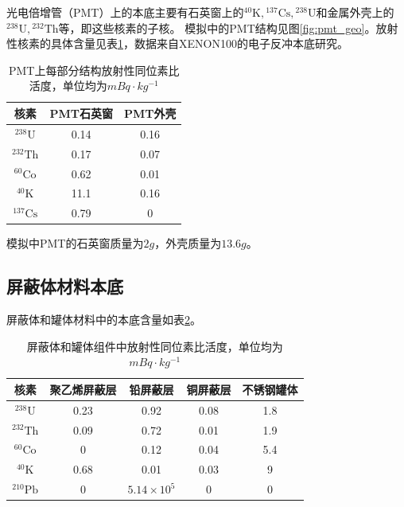 光电倍增管（PMT）上的本底主要有石英窗上的${}^{40}\mathrm{K},{}^{137}\mathrm{Cs},{}^{238}\mathrm{U}$和金属外壳上的${}^{238}\mathrm{U},{}^{232}\mathrm{Th}$等，即这些核素的子核。
模拟中的PMT结构见图\ref{fig:pmt_geo}。放射性核素的具体含量见表\ref{tab:pmt_radio}，数据来自XENON100的电子反冲本底研究\cite{xenon100_collaboration_study_2013}。

\begin{table}
  \centering
  \caption{PMT上每部分结构放射性同位素比活度，单位均为$\si{mBq\cdot kg^{-1}}$}
  \begin{tabular}{ccc}
    \toprule
    核素 & PMT石英窗 & PMT外壳 \\
    \midrule
    ${}^{238}\mathrm{U}$ & 0.14 & 0.16 \\
    ${}^{232}\mathrm{Th}$ & 0.17 & 0.07 \\
    ${}^{60}\mathrm{Co}$ & 0.62 & 0.01 \\
    ${}^{40}\mathrm{K}$ & 11.1 & 0.16 \\
    ${}^{137}\mathrm{Cs}$ & 0.79 & 0 \\
    \bottomrule
  \end{tabular}
  \label{tab:pmt_radio}
\end{table}

模拟中PMT的石英窗质量为$2\si{g}$，外壳质量为$13.6\si{g}$。

\subsection{屏蔽体材料本底}

屏蔽体和罐体材料中的本底含量如表\ref{tab:shield_radio}。

\begin{table}
  \centering
  \caption{屏蔽体和罐体组件中放射性同位素比活度，单位均为$\si{mBq\cdot kg^{-1}}$}
  \begin{tabular}{ccccc}
    \toprule
    核素 & 聚乙烯屏蔽层 & 铅屏蔽层 & 铜屏蔽层 & 不锈钢罐体 \\
    \midrule
    ${}^{238}\mathrm{U}$ & 0.23 & 0.92 & 0.08 & 1.8 \\
    ${}^{232}\mathrm{Th}$ & 0.09 & 0.72 & 0.01 & 1.9 \\
    ${}^{60}\mathrm{Co}$ & 0 & 0.12 & 0.04 & 5.4 \\
    ${}^{40}\mathrm{K}$ & 0.68 & 0.01 & 0.03 & 9 \\
    ${}^{210}\mathrm{Pb}$ & 0 & $5.14\times10^5$ & 0 & 0 \\
    \bottomrule
  \end{tabular}
  \label{tab:shield_radio}
\end{table}


